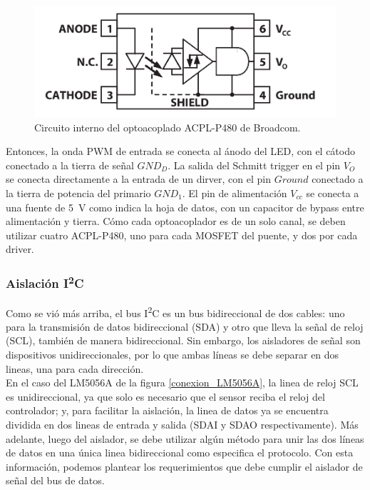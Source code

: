 \begin{figure}[h]
    \centering
    \includegraphics[scale=0.9]{Imagenes/ACPL-P480.png}
    \caption{Circuito interno del optoacoplado ACPL-P480 de Broadcom.}
    \label{circ_interno_opto}
\end{figure}

Entonces, la onda PWM de entrada se conecta al ánodo del LED, con el cátodo conectado a la tierra de señal $GND_D$. La salida del Schmitt trigger en el pin $V_O$ se conecta directamente a la entrada de un dirver, con el pin $Ground$ conectado a la tierra de potencia del primario $GND_1$. El pin de alimentación $V_{cc}$ se conecta a una fuente de \SI[]{5}[]{\volt} como indica la hoja de datos, con un capacitor de bypass entre alimentación y tierra. Cómo cada optoacoplador es de un solo canal, se deben utilizar cuatro ACPL-P480, uno para cada MOSFET del puente, y dos por cada driver.\\

\subsubsection{Aislación I\textsuperscript{2}C}

Como se vió más arriba, el bus I\textsuperscript{2}C es un bus bidireccional de dos cables: uno para la transmisión de datos bidireccional (SDA) y otro que lleva la señal de reloj (SCL), también de manera bidireccional. Sin embargo, los aisladores de señal son dispositivos unidireccionales, por lo que ambas líneas  se debe separar en dos lineas, una para cada dirección.\\

En el caso del LM5056A de la figura \ref{conexion_LM5056A}, la linea de reloj SCL es unidireccional, ya que solo es necesario que el sensor reciba el reloj del controlador; y, para facilitar la aislación, la linea de datos ya se encuentra dividida en dos lineas de entrada y salida (SDAI y SDAO respectivamente). Más adelante, luego del aislador, se debe utilizar algún método para unir las dos líneas de datos en una única linea bidireccional como especifica el protocolo. Con esta información, podemos plantear los requerimientos que debe cumplir el aislador de señal del bus de datos.\\

